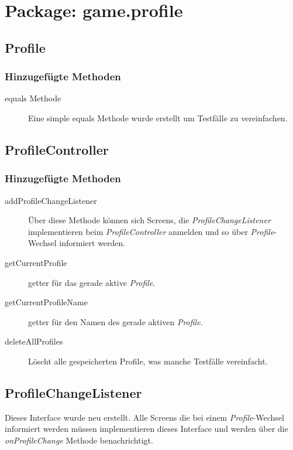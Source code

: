 \section{Package: game.profile}

\subsection{Profile}

\subsubsection{Hinzugefügte Methoden}
\begin{description}
\item[equals Methode]
Eine simple equals Methode wurde erstellt um Testfälle zu vereinfachen.
\end{description}


\subsection{ProfileController}

\subsubsection{Hinzugefügte Methoden}
\begin{description}
\item[addProfileChangeListener]
Über diese Methode können sich Screens, die \emph{ProfileChangeListener} implementieren beim \emph{ProfileController} anmelden und so über \emph{Profile}-Wechsel informiert werden.
\item[getCurrentProfile]
getter für das gerade aktive \emph{Profile}.
\item[getCurrentProfileName]
getter für den Namen des gerade aktiven \emph{Profile}.
\item[deleteAllProfiles]
Löscht alle gespeicherten Profile, was manche Testfälle vereinfacht.
\end{description}

\subsection{ProfileChangeListener}
Dieses Interface wurde neu erstellt. Alle Screens die bei einem  \emph{Profile}-Wechsel informiert werden müssen implementieren dieses Interface und werden über die \emph{onProfileChange} Methode benachrichtigt.




